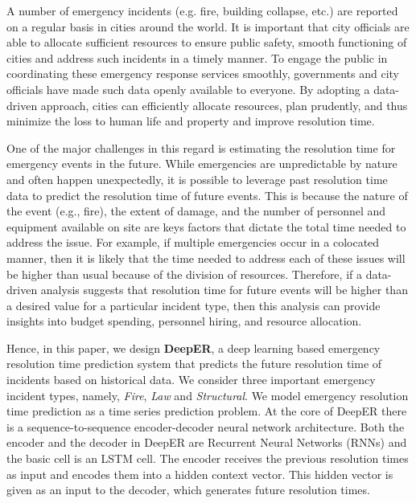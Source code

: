 

A number of emergency incidents (e.g. fire, building collapse, etc.) are reported on a regular basis in cities around the world. It is important that city officials are able to allocate sufficient resources to ensure public safety, smooth functioning of cities and address such incidents in a timely manner.  To  engage the public in coordinating these emergency response services smoothly, governments and city officials have made such data openly available to everyone. By adopting a data-driven approach, cities can efficiently allocate resources,  plan prudently, and thus minimize the loss to human life and property and improve resolution time. 

One of the major challenges in this regard is estimating the resolution time for  emergency events in the future. While emergencies are unpredictable by nature and often happen unexpectedly, it is possible to leverage past resolution time data to predict the resolution time of future events. This is because the nature of the event (e.g., fire), the extent of damage, and the number of personnel and equipment available on site are keys factors that dictate the total time needed to address the issue. For example, if multiple emergencies occur in a colocated manner, then it is likely that the time needed to address each of these issues will be higher than usual because of the division of resources. Therefore, if a data-driven analysis suggests that resolution time for future events will be higher than a desired value for a particular incident type, then this analysis can provide insights into budget spending, personnel hiring, and resource allocation.


Hence, in this paper, we design \textbf{DeepER}, a deep learning based emergency resolution time prediction system that predicts the future resolution time of incidents based on historical data. We consider three important emergency incident types, namely, \textit{Fire}, \textit{Law} and \textit{Structural}. We model emergency resolution time prediction as a time series prediction problem. At the core of DeepER there is a sequence-to-sequence encoder-decoder neural network architecture. Both the encoder and the decoder in DeepER are Recurrent Neural Networks (RNNs) and the basic cell is an LSTM cell. The encoder receives the previous resolution times as input and encodes them into a hidden context vector. This hidden vector is given as an input to the decoder, which generates future resolution times.


